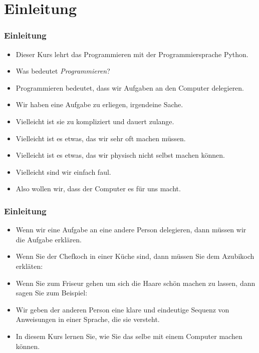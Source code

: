 \documentclass[aspectratio=169,mathserif,notheorems]{beamer}%
\subtitle{Einleitung}%
\begin{document}
%
%
\startPresentation%
%
\section{Einleitung}%
%
\begin{frame}%
\frametitle{Einleitung}%
\begin{itemize}%
\item Dieser Kurs lehrt das Programmieren mit der Programmiersprache Python.%
\item<2-> Was bedeutet \emph{Programmieren}?%
\item<3-> Programmieren bedeutet, dass wir Aufgaben an den Computer delegieren.%
\item<4-> Wir haben eine Aufgabe zu erliegen, irgendeine Sache.%
\item<5-> Vielleicht ist sie zu kompliziert und dauert zulange.%
\item<6-> Vielleicht ist es etwas, das wir sehr oft machen müssen.%
\item<7-> Vielleicht ist es etwas, das wir physisch nicht selbst machen können.%
\item<8-> Vielleicht sind wir einfach faul.%
\item<9-> Also wollen wir, dass der Computer es für uns macht.%
\end{itemize}%
\end{frame}%
%
\begin{frame}%
\frametitle{Einleitung}%
\begin{itemize}%
\item Wenn wir eine Aufgabe an eine andere Person delegieren, dann müssen wir die Aufgabe erklären.%
\item<2-> Wenn Sie der Chefkoch in einer Küche sind, dann müssen Sie dem Azubikoch erkläten: %
\item<3-> Wenn Sie zum Friseur gehen um sich die Haare schön machen zu lassen, dann sagen Sie zum Beispiel:
\item<4-> Wir geben der anderen Person eine klare und eindeutige Sequenz von Anweisungen in einer Sprache, die sie versteht.%
\item<5-> In diesem Kurs lernen Sie, wie Sie das selbe mit einem Computer machen können.%
\end{itemize}%
\end{frame}%
%
%
\end{document}
